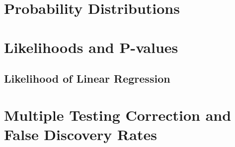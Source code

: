 \documentclass{pset}
\date{6/1/2025}
\begin{document}
\maketitle

\section*{Probability Distributions}

\subsection*{}

\subsection*{}

\subsection*{}


\section*{Likelihoods and P-values}

\subsection*{Likelihood of Linear Regression}








\section*{Multiple Testing Correction and False Discovery Rates}


\subsection*{}
\end{document}
